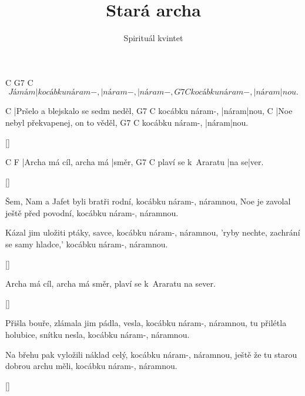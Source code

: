 \documentclass{song}
\title{Stará archa}
\author{Spirituál kvintet}
\begin{document}
          C                G7       C
\[ Já mám |kocábku náram-, |náram-, |náram-,
                G7    C
kocábku náram-, |náram|nou. \]
\endstrophe

\strophe
C
|Pršelo a blejskalo se sedm neděl, 
                G7      C
kocábku náram-, |náram|nou, 
C
|Noe nebyl překvapenej, on to věděl, 
                G7    C
kocábku náram-, |náram|nou. 
\endstrophe

\ref{}

\strophe
C                       F
|Archa má cíl, archa má |směr,
                   G7    C
plaví se k~Araratu |na se|ver.
\endstrophe

\ref{}

\begin{multicols}{2}
\strophe*
Šem, Nam a Jafet byli bratři rodní, 
kocábku náram-, náramnou, 
Noe je zavolal ještě před povodní, 
kocábku náram-, náramnou. 
\endstrophe

\strophe*
Kázal jim uložiti ptáky, savce, 
kocábku náram-, náramnou, 
'ryby nechte, zachrání se samy hladce,' 
kocábku náram-, náramnou.
\endstrophe
\end{multicols}

\ref{}

\strophe*
Archa má cíl, archa má směr,
plaví se k~Araratu na sever.
\endstrophe

\ref{}

\begin{multicols}{2}
\strophe*
Přišla bouře, zlámala jim pádla, vesla, 
kocábku náram-, náramnou, 
tu přilétla holubice, snítku nesla, 
kocábku náram-, náramnou. 
\endstrophe

\strophe*
Na břehu pak vyložili náklad celý, 
kocábku náram-, náramnou, 
ještě že tu starou dobrou archu měli, 
kocábku náram-, náramnou. 
\endstrophe
\end{multicols}

\ref{}
\end{document}
